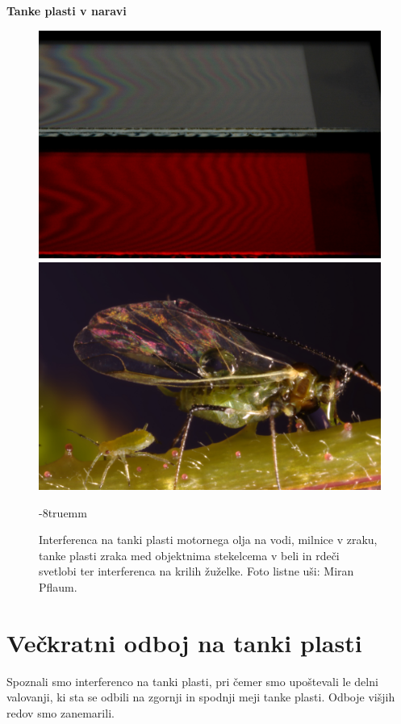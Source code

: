 \begin{example}{\bf Tanke plasti v naravi}
\begin{figure}[!ht]
\includegraphics[width=7truecm]{slike/06_photo_zrak.jpg}\hfill
\includegraphics[width=7truecm]{slike/06_photo_us.jpg}
\caption{Interferenca na tanki plasti motornega olja na vodi, 
milnice v zraku, tanke plasti zraka med objektnima stekelcema 
v beli in rdeči svetlobi ter interferenca
na krilih žuželke. Foto listne uši: Miran Pflaum.}
\vglue-8truemm
\label{fig:06_Photos}
\end{figure}

\end{example}

\section{Večkratni odboj na tanki plasti}
Spoznali smo interferenco na tanki plasti, pri čemer
smo upoštevali le delni valovanji, ki sta se odbili na zgornji in 
spodnji meji tanke plasti. Odboje višjih redov smo zanemarili.

